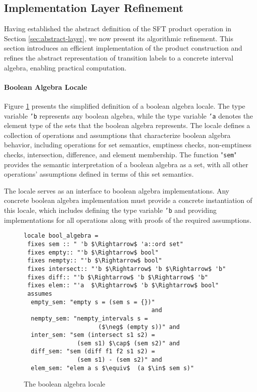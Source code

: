 \subsection{Implementation Layer Refinement}
\label{sec_alg_refinement}
Having established the abstract definition of the SFT product operation in Section \ref{sec:abstract-layer}, we now present its algorithmic refinement. This section introduces an efficient implementation of the product construction and refines the abstract representation of transition labels to a concrete interval algebra, enabling practical computation.


\paragraph{Boolean Algebra Locale}

Figure \ref{fig-bool-algebra-locale} presents the simplified definition of a boolean algebra locale. The type variable \texttt{'b} represents any boolean algebra, while the type variable \texttt{'a} denotes the element type of the sets that the boolean algebra represents. The locale defines a collection of operations and assumptions that characterize boolean algebra behavior, including operations for set semantics, emptiness checks, non-emptiness checks, intersection, difference, and element membership. The function "\texttt{sem}" provides the semantic interpretation of a boolean algebra as a set, with all other operations' assumptions defined in terms of this set semantics.

The locale serves as an interface to boolean algebra implementations. Any concrete boolean algebra implementation must provide a concrete instantiation of this locale, which includes defining the type variable \texttt{'b} and providing implementations for all operations along with proofs of the required assumptions.


\begin{figure}[hbt!]
\begin{lstlisting}[mathescape=true]
locale bool_algebra =
 fixes sem :: " 'b $\Rightarrow$ 'a::ord set"
 fixes empty:: "'b $\Rightarrow$ bool"
 fixes nempty:: "'b $\Rightarrow$ bool"
 fixes intersect:: "'b $\Rightarrow$ 'b $\Rightarrow$ 'b"
 fixes diff:: "'b $\Rightarrow$ 'b $\Rightarrow$ 'b"
 fixes elem:: "'a  $\Rightarrow$ 'b $\Rightarrow$ bool"
 assumes
  empty_sem: "empty s = (sem s = {})"
                                    and
  nempty_sem: "nempty_intervals s =
                     ($\neg$ (empty s))" and
  inter_sem: "sem (intersect s1 s2) =
               (sem s1) $\cap$ (sem s2)" and
  diff_sem: "sem (diff f1 f2 s1 s2) =
               (sem s1) - (sem s2)" and
  elem_sem: "elem a s $\equiv$  (a $\in$ sem s)"
\end{lstlisting}
\caption{The boolean algebra locale}
\label{fig-bool-algebra-locale}
\end{figure}




